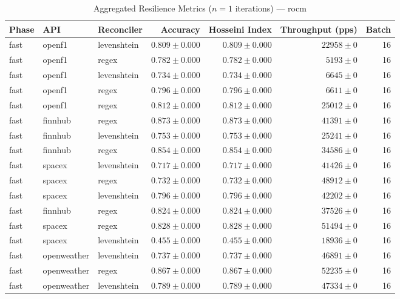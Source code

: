 
\begin{table}[htbp]
\caption{Aggregated Resilience Metrics ($n=1$ iterations) --- rocm}
\begin{tabular}{l l l r r r r}
\hline
Phase & API & Reconciler & Accuracy & Hosseini Index & Throughput (pps) & Batch \\
\hline
fast & openf1 & levenshtein & $0.809\pm0.000$ & $0.809\pm0.000$ & $22958\pm0$ & 16 \\
fast & openf1 & regex & $0.782\pm0.000$ & $0.782\pm0.000$ & $5193\pm0$ & 16 \\
fast & openf1 & levenshtein & $0.734\pm0.000$ & $0.734\pm0.000$ & $6645\pm0$ & 16 \\
fast & openf1 & regex & $0.796\pm0.000$ & $0.796\pm0.000$ & $6611\pm0$ & 16 \\
fast & openf1 & regex & $0.812\pm0.000$ & $0.812\pm0.000$ & $25012\pm0$ & 16 \\
fast & finnhub & regex & $0.873\pm0.000$ & $0.873\pm0.000$ & $41391\pm0$ & 16 \\
fast & finnhub & levenshtein & $0.753\pm0.000$ & $0.753\pm0.000$ & $25241\pm0$ & 16 \\
fast & finnhub & regex & $0.854\pm0.000$ & $0.854\pm0.000$ & $34586\pm0$ & 16 \\
fast & spacex & levenshtein & $0.717\pm0.000$ & $0.717\pm0.000$ & $41426\pm0$ & 16 \\
fast & spacex & regex & $0.732\pm0.000$ & $0.732\pm0.000$ & $48912\pm0$ & 16 \\
fast & spacex & levenshtein & $0.796\pm0.000$ & $0.796\pm0.000$ & $42202\pm0$ & 16 \\
fast & finnhub & regex & $0.824\pm0.000$ & $0.824\pm0.000$ & $37526\pm0$ & 16 \\
fast & spacex & regex & $0.828\pm0.000$ & $0.828\pm0.000$ & $51494\pm0$ & 16 \\
fast & spacex & levenshtein & $0.455\pm0.000$ & $0.455\pm0.000$ & $18936\pm0$ & 16 \\
fast & openweather & levenshtein & $0.737\pm0.000$ & $0.737\pm0.000$ & $46891\pm0$ & 16 \\
fast & openweather & regex & $0.867\pm0.000$ & $0.867\pm0.000$ & $52235\pm0$ & 16 \\
fast & openweather & levenshtein & $0.789\pm0.000$ & $0.789\pm0.000$ & $47334\pm0$ & 16 \\

\end{tabular}
\end{table}
